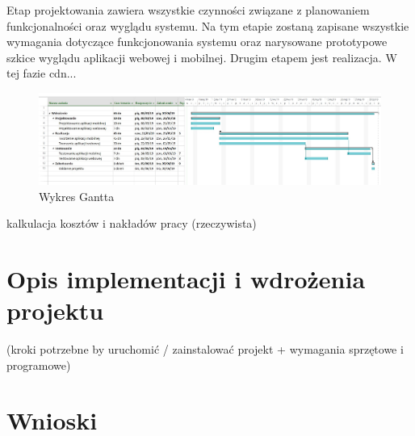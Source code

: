 \documentclass[12pt]{article}
\begin{document}
Etap projektowania zawiera wszystkie czynności związane z planowaniem funkcjonalności oraz wyglądu systemu. Na tym etapie zostaną zapisane wszystkie wymagania dotyczące funkcjonowania systemu oraz narysowane prototypowe szkice wyglądu aplikacji webowej i mobilnej.
Drugim etapem jest realizacja. W tej fazie cdn...
	\begin{figure}[H]
		\centering
		\includegraphics[scale=0.5, angle=270]{wykres_ganttaV2.png}
		\caption{Wykres Gantta}
	\end{figure}
	
	kalkulacja kosztów i nakładów pracy (rzeczywista)


\newpage
\section{Opis implementacji i wdrożenia projektu}
(kroki potrzebne by uruchomić / zainstalować projekt + wymagania sprzętowe i programowe)


\newpage
\section{Wnioski}
\end{document}
